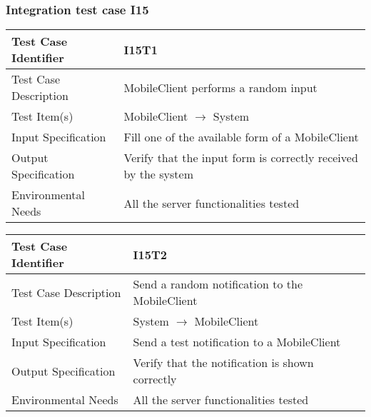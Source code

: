 		\subsubsection{Integration test case I15}
		\begin{center}
			\begin{tabular}{ |l p{10cm}| } \hline
				Test Case Identifier & I15T1 \\ \hline
				Test Case Description & MobileClient performs a random input \\ \hline
				Test Item(s) & MobileClient $\rightarrow$ System \\ \hline
				Input Specification & Fill one of the available form of a MobileClient \\ \hline
				Output Specification & Verify that the input form is correctly received by the system \\ \hline
				Environmental Needs & All the server functionalities tested \\ \hline
			\end{tabular}
		\end{center}
		\vspace{1cm}
		\begin{center}
			\begin{tabular}{ |l p{10cm}| } \hline
				Test Case Identifier & I15T2 \\ \hline
				Test Case Description & Send a random notification to the MobileClient \\ \hline
				Test Item(s) & System $\rightarrow$ MobileClient \\ \hline
				Input Specification & Send a test notification to a MobileClient \\ \hline
				Output Specification & Verify that the notification is shown correctly \\ \hline
				Environmental Needs & All the server functionalities tested \\ \hline
			\end{tabular}
		\end{center}

